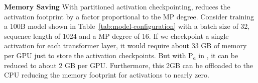 \begin{comment}
\name: $P_a$ reduces the memory footprint of the activations by removes memory redundancy from MP by partitioning the activations instead of replicating them
P$_{a+cpu}$: Activation partitioning and CPU Checkpointing\label{sec:pa}
Activation checkpointing \cite{DBLP:journals/corr/ChenXZG16} can significantly reduce the memory footprint of the activations by storing only a few activations during the forward propagation and re-computing the remaining during the backward propagation as needed. However, for large models, the memory footprint of checkpointed activations is still quite significant. In presence of MP, it is possible to reduce the memory footprint by a factor proportional to the model paralleism degree by what we will refer to as activation partitioning.

In tensor-slicing based MP, such as the one implemented in Megatron, parameters are partitioned across model parallel process, while the activations are generally replicated. For example, consider a linear layer, where the parameters are partitioned across the hidden dimension and store across multiple GPUs. Each GPU will compute a part of the output, but to do so, the entire input must be present on each GPU. After the output is computed, it must again be all-gathered on each GPU before the next linear layer can be computed, therefore requiring replication of the activations. This replication of activation is found all across Megatron-LM.

During the training with activation checkpointing, each GPU is keeping a replicated copy of the checkpointed activations. \name removes this replication by partitioning the activation checkpoint across the GPUs. Then during backward propagation, when the activations are needed for re-computation, \name performs an allgather operation to reconstruct the full activation. 
\end{comment}

\textbf{Memory Saving} With partitioned activation checkpointing, \name reduces the activation footprint by a factor proportional to the MP degree. Consider training a 100B model shown in Table~\ref{tab:model-configuration} with a batch size of 32, sequence length of 1024 and a MP degree of 16. If we checkpoint a single activation for each transformer layer, it would require about 33 GB of memory per GPU just to store the activation checkpoints. But with P$_a$ in \name, it can be reduced to about 2 GB per GPU. Furthermore, this 2GB can be offloaded  to the CPU reducing the memory footprint for activations to nearly zero.
